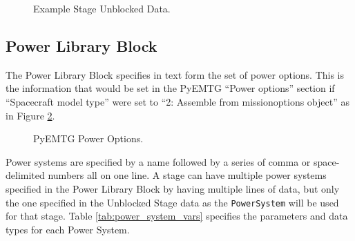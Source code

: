\documentclass[11pt]{article}
\begin{document}
\begin{figure}[H]
	\centering
	\caption{\label{fig:example_stage_unblocked_data}Example Stage Unblocked Data.}
\end{figure}

\subsection{Power Library Block}
\label{sec:power_library_block}

The Power Library Block specifies in text form the set of power options. This is the information that would be set in the PyEMTG ``Power options'' section if ``Spacecraft model type'' were set to ``2: Assemble from missionoptions object'' as in Figure \ref{fig:power_options}. 

\begin{figure}[H]
	\centering
	\caption{\label{fig:power_options}PyEMTG Power Options.}
\end{figure}

\noindent Power systems are specified by a name followed by a series of comma or space-delimited numbers all on one line. A stage can have multiple power systems specified in the Power Library Block by having multiple lines of data, but only the one specified in the Unblocked Stage data as the \texttt{PowerSystem} will be used for that stage. Table \ref{tab:power_system_vars} specifies the parameters and data types for each Power System.
\end{document}
